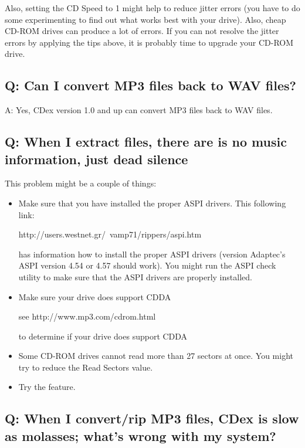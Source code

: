 Also, setting the CD Speed to 1 might help to reduce 
jitter errors (you have to do some experimenting to find out what works best 
with your drive). Also, cheap CD-ROM drives can produce a lot of errors. If you can 
not resolve the jitter errors by applying the tips above, it is probably time to 
upgrade your CD-ROM drive.

\subsection{Q: Can I convert MP3 files back to WAV files?}

A: Yes, CDex version 1.0 and up can convert MP3 files back to WAV files.


\subsection{Q: When I extract files, there are is no music information, just dead
silence}

This problem might be a couple of things:

\begin{itemize}
\itemsep=0pt
\item Make sure that you have installed the proper ASPI drivers. This following
link:

http://users.westnet.gr/~vamp71/rippers/aspi.htm

has information how to install the proper ASPI drivers (version Adaptec's
ASPI version 4.54 or 4.57 should work). You might run the ASPI check utility
to make sure that the ASPI drivers are properly installed.
\item Make sure your drive does support CDDA

see http://www.mp3.com/cdrom.html

to determine if your drive does support CDDA

\item Some CD-ROM drives cannot read more than 27 sectors at once. You might
try to reduce the Read Sectors value.
\item Try the  feature.
\end{itemize}


\subsection{Q: When I convert/rip MP3 files, CDex is slow as molasses; what's wrong
with my system?}

